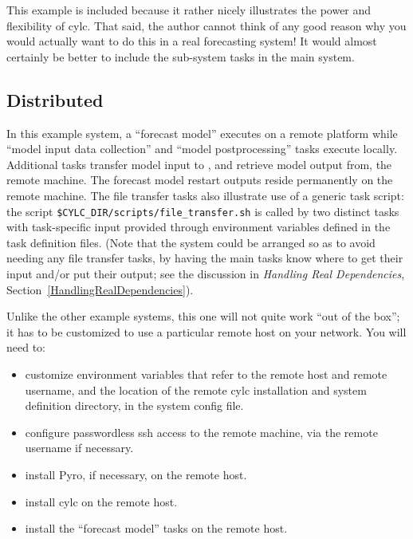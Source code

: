 \documentclass[11pt,a4paper]{article}
\begin{document}
This example is included because it rather nicely illustrates the power
and flexibility of cylc. That said, the author cannot think of any good
reason why you would actually want to do this in a real forecasting
system! It would almost certainly be better to include the sub-system
tasks in the main system.


\subsection{Distributed}
\label{Distributed}

In this example system, a ``forecast model'' executes on a remote
platform while ``model input data collection'' and ``model
postprocessing'' tasks execute locally. Additional tasks transfer model
input to , and retrieve model output from, the remote machine. The
forecast model restart outputs reside permanently on the remote machine.
The file transfer tasks also illustrate use of a generic task script:
the script \lstinline=$CYLC_DIR/scripts/file_transfer.sh= is called by
two distinct tasks with task-specific input provided through environment
variables defined in the task definition files.  (Note that the system
could be arranged so as to avoid needing any file transfer tasks, by
having the main tasks know where to get their input and/or put their
output; see the discussion in {\em Handling Real Dependencies},
Section~\ref{HandlingRealDependencies}).

Unlike the other example systems, this one will not quite work ``out of
the box''; it has to be customized to use a particular remote host on
your network. You will need to:

\begin{itemize}

    \item customize environment variables that refer to the remote 
        host and remote username, and the location of the remote 
        cylc installation and system definition directory, in the system
        config file. 

    \item configure passwordless ssh access to the remote machine,
        via the remote username if necessary.

    \item install Pyro, if necessary, on the remote host.

    \item install cylc on the remote host.

    \item install the ``forecast model'' tasks on the remote host.

\end{itemize}
\end{document}
